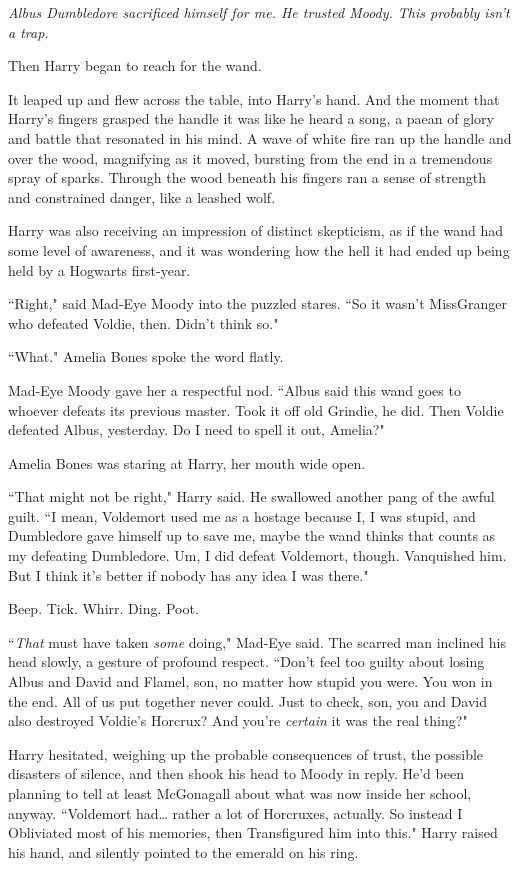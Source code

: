 \emph{Albus Dumbledore sacrificed himself for me. He trusted Moody. This probably isn't a trap.}

Then Harry began to reach for the wand.

It leaped up and flew across the table, into Harry's hand. And the moment that Harry's fingers grasped the handle it was like he heard a song, a paean of glory and battle that resonated in his mind. A wave of white fire ran up the handle and over the wood, magnifying as it moved, bursting from the end in a tremendous spray of sparks. Through the wood beneath his fingers ran a sense of strength and constrained danger, like a leashed wolf.

Harry was also receiving an impression of distinct skepticism, as if the wand had some level of awareness, and it was wondering how the hell it had ended up being held by a Hogwarts first-year.

``Right," said Mad-Eye Moody into the puzzled stares. ``So it wasn't Miss\?Granger who defeated Voldie, then. Didn't think so."

``What." Amelia Bones spoke the word flatly.

Mad-Eye Moody gave her a respectful nod. ``Albus said this wand goes to whoever defeats its previous master. Took it off old Grindie, he did. Then Voldie defeated Albus, yesterday. Do I need to spell it out, Amelia?"

Amelia Bones was staring at Harry, her mouth wide open.

``That might not be right," Harry said. He swallowed another pang of the awful guilt. ``I mean, Voldemort used me as a hostage because I, I was stupid, and Dumbledore gave himself up to save me, maybe the wand thinks that counts as my defeating Dumbledore. Um, I did defeat Voldemort, though. Vanquished him. But I think it's better if nobody has any idea I was there."

Beep. Tick. Whirr. Ding. Poot.

``\emph{That} must have taken \emph{some} doing," Mad-Eye said. The scarred man inclined his head slowly, a gesture of profound respect. ``Don't feel too guilty about losing Albus and David and Flamel, son, no matter how stupid you were. You won in the end. All of us put together never could. Just to check, son, you and David also destroyed Voldie's Horcrux? And you're \emph{certain} it was the real thing?"

Harry hesitated, weighing up the probable consequences of trust, the possible disasters of silence, and then shook his head to Moody in reply. He'd been planning to tell at least McGonagall about what was now inside her school, anyway. ``Voldemort had{\ldots} rather a lot of Horcruxes, actually. So instead I Obliviated most of his memories, then Transfigured him into this." Harry raised his hand, and silently pointed to the emerald on his ring.

